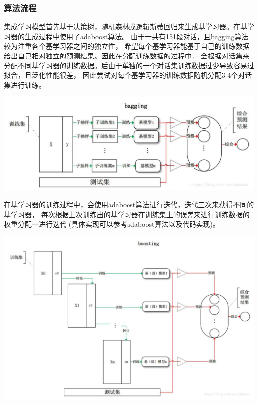\documentclass[11pt]{article}
\begin{document}
            \subsubsection{算法流程}
            集成学习模型首先基于决策树，随机森林或逻辑斯蒂回归来生成基学习器。在基学习器的生成过程中使用了adaboost算法。
            由于一共有151段对话，且bagging算法较为注重各个基学习器之间的独立性，
            希望每个基学习器能基于自己的训练数据给出自己相对独立的预测结果。因此在分配训练数据的过程中，
            会根据对话集来分配不同基学习器的训练数据。后由于单独的一个对话集训练数据过少导致容易过拟合，且泛化性能很差，
            因此尝试对每个基学习器的训练数据随机分配3-4个对话集进行训练。
            \begin{center}
                \includegraphics[scale = 1.1]{graph/tradition1.png}
            \end{center}

            在基学习器的训练过程中，会使用adaboost算法进行迭代，迭代三次来获得不同的基学习器，
            每次根据上次训练出的基学习器在训练集上的误差来进行训练数据的权重分配一进行迭代
            (具体实现可以参考adaboost算法以及代码实现)。
            \begin{center}
                \includegraphics[scale = 1.1]{graph/tradition2.png}
            \end{center}
\end{document}
